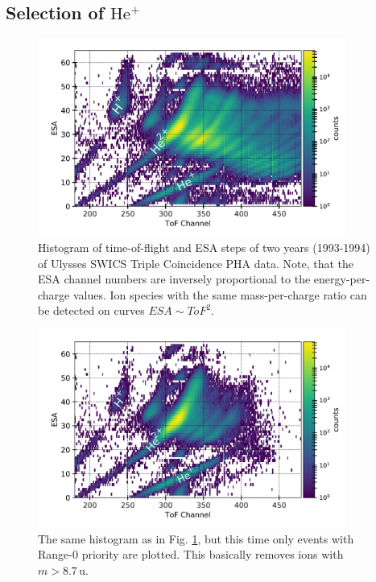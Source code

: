 \subsection{Selection of $\mathrm{He^{+}}$}

\begin{figure}[h]
	\includegraphics[width=0.9\textwidth]{Figures/epq_all.png}
	\centering
	\caption{Histogram of time-of-flight and ESA steps of two years (1993-1994) of Ulysses SWICS Triple Coincidence PHA data. Note, that the ESA channel numbers are inversely proportional to the energy-per-charge values. Ion species with the same mass-per-charge ratio can be detected on curves $ESA \sim ToF^2$.}
	\label{fig:epq_all}
\end{figure}

\begin{figure}[h]
	\includegraphics[width=0.9\textwidth]{Figures/epq_rng0.png}
	\centering
	\caption{The same histogram as in Fig. \ref{fig:epq_all}, but this time only events with Range-0 priority are plotted. This basically removes ions with $m>8.7\,\mathrm{u}$.}
	\label{fig:epq_rng0}
\end{figure}


